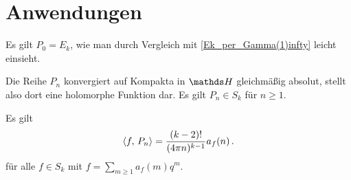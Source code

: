 \section{Anwendungen}

\begin{beme}
Es gilt $P_0 = E_k$, wie man durch Vergleich mit \autoref{Ek_per_Gamma(1)infty} leicht einsieht.
\end{beme}

\begin{satz-list}\label{<f,Pn>}
\item Die Reihe $P_n$ konvergiert auf Kompakta in $\HH$ gleichmäßig absolut, stellt also dort eine holomorphe Funktion dar. Es gilt $P_n \in S_k$ für $n \geq 1$.
\item Es gilt 
\[
	\scalarprd {f}{P_n} = \frac{(k-2)!}{(4\pi n)^{k-1}} a_f(n)
	\,.
\]
für alle $f \in S_k$ mit $f = \sum_{m\geq 1} a_f(m) q^m$.
\end{satz-list}

